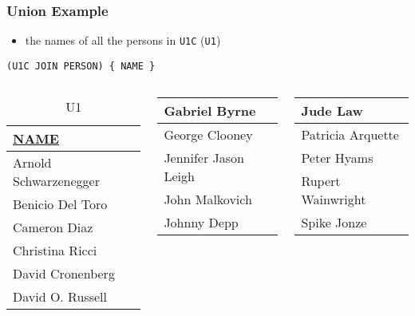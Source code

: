 \documentclass[dvipsnames]{beamer}
\theoremstyle{plain}
\begin{document}
\begin{frame}[fragile]
  \frametitle{Union Example}

  \begin{example}
    \begin{itemize}
      \item the names of all the persons in \texttt{U1C} (\texttt{U1})
    \end{itemize}

    \begin{lstlisting}
(U1C JOIN PERSON) { NAME }
    \end{lstlisting}

    \pause
    \vspace{-10pt}
    \begin{columns}[b]
      \begin{tiny}
      \begin{table}
        \caption{U1}
        \begin{tabular}{|l|}\hline
\underline{NAME}     \\[2pt]\hline\hline
Arnold Schwarzenegger\\\hline
Benicio Del Toro     \\\hline
Cameron Diaz         \\\hline
Christina Ricci      \\\hline
David Cronenberg     \\\hline
David O. Russell     \\\hline
        \end{tabular}
      \end{table}
      \end{tiny}

      \begin{tiny}
      \begin{table}
        \begin{tabular}{|l|}\hline
Gabriel Byrne        \\\hline
George Clooney       \\\hline
Jennifer Jason Leigh \\\hline
John Malkovich       \\\hline
Johnny Depp          \\\hline
        \end{tabular}
      \end{table}
      \end{tiny}

      \begin{tiny}
      \begin{table}
        \begin{tabular}{|l|}\hline
Jude Law             \\\hline
Patricia Arquette    \\\hline
Peter Hyams          \\\hline
Rupert Wainwright    \\\hline
Spike Jonze          \\\hline
        \end{tabular}
      \end{table}
      \end{tiny}


\end{columns}
\end{example}
\end{frame}
\end{document}
